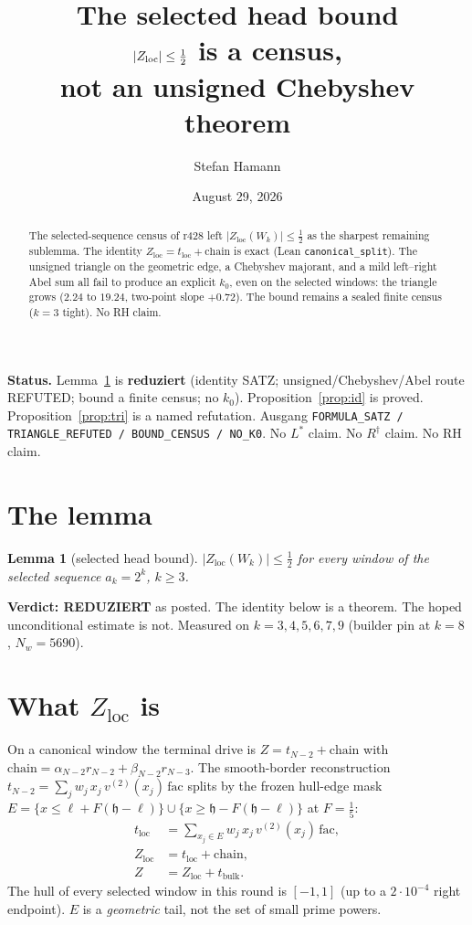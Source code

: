 \documentclass[11pt]{article}
\title{\bfseries The selected head bound\\[2mm]
\large $\lvert\Zloc\rvert\le\tfrac12$ is a census,\\
not an unsigned Chebyshev theorem}
\author{Stefan Hamann}
\date{August 29, 2026}
\newtheorem{lemma}{Lemma}
\theoremstyle{remark}
\newcommand{\Zloc}{Z_{\mathrm{loc}}}
\begin{document}
\maketitle

\begin{abstract}\noindent
The selected-sequence census of r428 left
$\lvert\Zloc(W_k)\rvert\le\tfrac12$ as the
sharpest remaining sublemma.
The identity
$\Zloc=t_{\mathrm{loc}}+\mathrm{chain}$
is exact (Lean \texttt{canonical\_split}).
The unsigned triangle on the geometric
edge, a Chebyshev majorant, and a mild
left--right Abel sum all fail to produce
an explicit $k_0$, even on the selected
windows: the triangle grows
($2.24$ to $19.24$, two-point slope $+0.72$).
The bound remains a sealed finite census
($k=3$ tight).
No RH claim.
\end{abstract}

\medskip\noindent
\textbf{Status.}\enspace
Lemma~\ref{lem:z0} is \textbf{reduziert}
(identity SATZ; unsigned/Chebyshev/Abel
route REFUTED; bound a finite census;
no $k_0$).
Proposition~\ref{prop:id} is proved.
Proposition~\ref{prop:tri} is a named
refutation.
Ausgang
\texttt{FORMULA\_SATZ / TRIANGLE\_REFUTED / BOUND\_CENSUS / NO\_K0}.
No $L^{*}$ claim.  No $R^{\dagger}$ claim.  No RH claim.

\section{The lemma}\label{sec:lem}

\begin{lemma}[selected head bound]\label{lem:z0}
$\lvert\Zloc(W_k)\rvert\le\tfrac12$ for every
window of the selected sequence $a_k=2^k$,
$k\ge 3$.
\end{lemma}

\noindent
\textbf{Verdict: REDUZIERT} as posted.
The identity below is a theorem.
The hoped unconditional estimate is not.
Measured on $k=3,4,5,6,7,9$
(builder pin at $k=8$, $N_w=5690$).

\section{What $\Zloc$ is}\label{sec:id}

On a canonical window the terminal drive is
$Z=t_{N-2}+\mathrm{chain}$ with
$\mathrm{chain}=\alpha_{N-2}r_{N-2}+\beta_{N-2}r_{N-3}$.
The smooth-border reconstruction
$t_{N-2}=\sum_j w_j\,x_j\,v^{(2)}(x_j)\,\mathrm{fac}$
splits by the frozen hull-edge mask
$E=\{x\le \ell+F(\mathfrak{h}-\ell)\}\cup
\{x\ge \mathfrak{h}-F(\mathfrak{h}-\ell)\}$
at $F=\tfrac15$:
\begin{align*}
  t_{\mathrm{loc}}
  &=
  \sum_{x_j\in E} w_j\,x_j\,v^{(2)}(x_j)\,\mathrm{fac},\\
  \Zloc
  &=
  t_{\mathrm{loc}}+\mathrm{chain},\\
  Z
  &=
  \Zloc+t_{\mathrm{bulk}}.
\end{align*}
The hull of every selected window in this
round is $[-1,1]$ (up to a $2\cdot10^{-4}$
right endpoint).
$E$ is a \emph{geometric} tail, not the
set of small prime powers.
\end{document}
